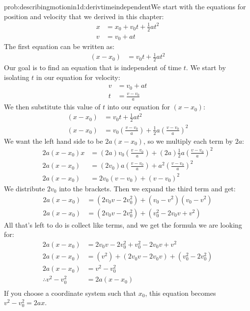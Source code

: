\begin{solution}{prob:describingmotionin1d:derivtimeindependent}\label{soln:describingmotionin1d:derivtimeindependent}We start with the equations for position and velocity that we derived in this chapter:
\begin{align*}
x&=x_0+v_0t+\frac{1}{2}at^2\\
v&=v_0+at
\end{align*}
The first equation can be written as:
\begin{align*}
(x-x_0)&=v_0t+\frac{1}{2}at^2
\end{align*}
Our goal is to find an equation that is independent of time $t$. We start by isolating $t$ in our equation for velocity:
\begin{align*}
v&=v_0+at\\
t&=\frac{v-v_0}{a}
\end{align*}
We then substitute this value of $t$ into our equation for $(x-x_0)$:
\begin{align*}
(x-x_0)&=v_0t+\frac{1}{2}at^2\\
(x-x_0)&=v_0\left(\frac{v-v_0}{a}\right)+\frac{1}{2}a\left(\frac{v-v_0}{a}\right)^2
\end{align*}
We want the left hand side to be $2a(x-x_0)$, so we multiply each term by $2a$:
\begin{align*}
2a(x-x_0)x&=(2a)v_0\left( \frac{v-v_0}{a}\right) +(2a)\frac{1}{2}a\left( \frac{v-v_0}{a}\right) ^2\\
2a(x-x_0)&=(2v_0)a\left(\frac{v-v_0}{a}\right)+a^2\left( \frac{v-v_0}{a}\right) ^2\\
2a(x-x_0)&=2v_0(v-v_0)+(v-v_0)^2
\end{align*}
We distribute $2v_0$ into the brackets. Then we expand the third term and get:
\begin{align*}
2a(x-x_0)&=(2v_0v-2v_0^2)+(v_0-v^2)(v_0-v^2)\\
2a(x-x_0)&=(2v_0v-2v_0^2)+(v_0^2-2v_0v+v^2)
\end{align*}
All that's left to do is collect like terms, and we get the formula we are looking for:
\begin{align*}
2a(x-x_0)&=2v_0v-2v_0^2+v_0^2-2v_0v+v^2\\
2a(x-x_0)&=(v^2)+(2v_0v-2v_0v)+(v_0^2-2v_0^2)\\
2a(x-x_0)&=v^2-v_0^2\\
\therefore v^2-v_0^2&=2a(x-x_0)\\
\end{align*}
If you choose a coordinate system such that $x_0$, this equation becomes $v^2-v_0^2=2ax$.
\end{solution}

